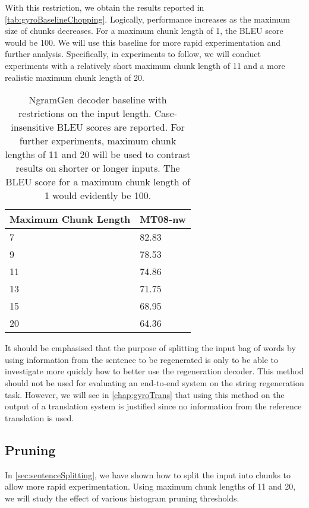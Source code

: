 With this restriction, we obtain the results reported
in \autoref{tab:gyroBaselineChopping}. Logically, performance
increases as the maximum size of chunks decreases.
For a maximum chunk length of 1, the BLEU score would be 100.
We will use this baseline
for more rapid experimentation and further analysis.
Specifically, in experiments to follow,
we will conduct experiments with a relatively short maximum chunk
length of 11 and a more realistic maximum chunk length of 20.
%
\begin{table}
  \begin{center}
  \begin{tabular}{l|l}
    Maximum Chunk Length & MT08-nw \\
    \hline
     7 & 82.83 \\
     9 & 78.53 \\
     11 & 74.86 \\
     13 & 71.75 \\
     15 & 68.95 \\
     20 & 64.36 \\
  \end{tabular}
  \caption{NgramGen decoder baseline with restrictions on the input length.
    Case-insensitive BLEU scores are reported. For further experiments, maximum
    chunk lengths of 11 and 20 will be used to contrast results on shorter or longer
    inputs. The BLEU score for a maximum chunk length of 1 would evidently be 100.}
  \label{tab:gyroBaselineChopping}
  \end{center}
\end{table}
%

It should be emphasised that the purpose of splitting the input bag of words by using
information from the sentence to be regenerated is only to be able
to investigate more quickly how to better use the regeneration decoder. This
method should not be used for evaluating an end-to-end system on the string regeneration
task. However, we will see in \autoref{chap:gyroTrans} that using this method
on the output of a translation system is justified since no information from the reference
translation is used.

\subsection{Pruning}
\label{sec:gyroPruning}

In \autoref{sec:sentenceSplitting}, we have shown how to split the input
into chunks to allow more rapid experimentation. Using maximum chunk lengths
of 11 and 20, we will study the effect of various histogram pruning
thresholds.

